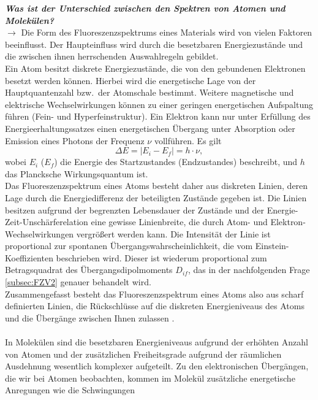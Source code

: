 \textbf{\textit{Was ist der Unterschied zwischen den Spektren von Atomen und Molekülen?}} \\
$\rightarrow$
Die Form des Fluoreszenzspektrums eines Materials wird von vielen Faktoren beeinflusst. 
Der Haupteinfluss wird durch die besetzbaren Energiezustände und die zwischen ihnen herrschenden 
Auswahlregeln gebildet. \\
Ein Atom besitzt diskrete Energiezustände, die von den gebundenen Elektronen besetzt werden können. 
Hierbei wird die energetische Lage von der Hauptquantenzahl bzw.~der Atomschale bestimmt. 
Weitere magnetische und elektrische Wechselwirkungen können zu einer geringen energetischen 
Aufspaltung führen (Fein- und Hyperfeinstruktur). 
Ein Elektron kann nur unter Erfüllung des Energieerhaltungssatzes einen energetischen Übergang 
unter Absorption oder Emission eines Photons der Frequenz $\nu$ vollführen. Es gilt
\begin{equation}
    \Delta{E} = \left\vert E_{i} - E_{f}\right\vert = h\cdot\nu,
\end{equation} 
wobei $E_{i}$ ($E_{f}$) die Energie des Startzustandes (Endzustandes) beschreibt, und $h$ das 
Plancksche Wirkungsquantum ist. \\
Das Fluoreszenzspektrum eines Atoms besteht daher aus diskreten Linien, 
deren Lage durch die Energiedifferenz der beteiligten Zustände gegeben ist.
Die Linien besitzen aufgrund der begrenzten Lebensdauer der Zustände und der 
Energie-Zeit-Unschärferelation eine gewisse Linienbreite, die durch Atom- und 
Elektron-Wechselwirkungen vergrößert werden kann.
Die Intensität der Linie ist proportional zur spontanen Übergangswahrscheinlichkeit, 
die vom Einstein-Koeffizienten beschrieben wird. 
Dieser ist wiederum proportional zum Betragsquadrat des Übergangsdipolmoments $D_{if}$, 
das in der nachfolgenden Frage \ref{subsec:FZV2} genauer behandelt wird. \\
Zusammengefasst besteht das Fluoreszenzspektrum eines Atoms also aus scharf definierten 
Linien, die Rückschlüsse auf die diskreten Energieniveaus des Atoms und die Übergänge zwischen 
Ihnen zulassen \cite{Demtroder,EPC}. \\ \\
In Molekülen sind die besetzbaren Energieniveaus aufgrund der erhöhten Anzahl von 
Atomen und der zusätzlichen Freiheitsgrade aufgrund der räumlichen Ausdehnung 
wesentlich komplexer aufgeteilt.
Zu den elektronischen Übergängen, die wir bei Atomen beobachten, 
kommen im Molekül zusätzliche energetische Anregungen wie die Schwingungen 
